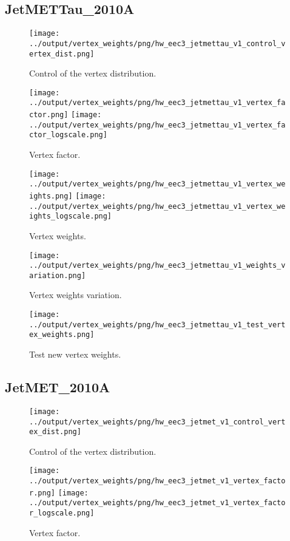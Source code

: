 \documentclass[11pt]{book}
\begin{document}
\subsection{JetMETTau\_2010A}
\begin{figure}[ht]
\centering
\texttt{[image: ../output/vertex\_weights/png/hw\_eec3\_jetmettau\_v1\_control\_vertex\_dist.png]}
\caption{Control of the vertex distribution.}
\end{figure}

\begin{figure}[ht]
\centering
\texttt{[image: ../output/vertex\_weights/png/hw\_eec3\_jetmettau\_v1\_vertex\_factor.png]}
\texttt{[image: ../output/vertex\_weights/png/hw\_eec3\_jetmettau\_v1\_vertex\_factor\_logscale.png]}
\caption{Vertex factor.}
\end{figure}

\begin{figure}[ht]
\centering
\texttt{[image: ../output/vertex\_weights/png/hw\_eec3\_jetmettau\_v1\_vertex\_weights.png]}
\texttt{[image: ../output/vertex\_weights/png/hw\_eec3\_jetmettau\_v1\_vertex\_weights\_logscale.png]}
\caption{Vertex weights.}
\end{figure}

\begin{figure}[ht]
\centering
\texttt{[image: ../output/vertex\_weights/png/hw\_eec3\_jetmettau\_v1\_weights\_variation.png]}
\caption{Vertex weights variation.}
\end{figure}

\begin{figure}[ht]
\centering
\texttt{[image: ../output/vertex\_weights/png/hw\_eec3\_jetmettau\_v1\_test\_vertex\_weights.png]}
\caption{Test new vertex weights.}
\end{figure}
\clearpage

\subsection{JetMET\_2010A}
\begin{figure}[ht]
\centering
\texttt{[image: ../output/vertex\_weights/png/hw\_eec3\_jetmet\_v1\_control\_vertex\_dist.png]}
\caption{Control of the vertex distribution.}
\end{figure}

\begin{figure}[ht]
\centering
\texttt{[image: ../output/vertex\_weights/png/hw\_eec3\_jetmet\_v1\_vertex\_factor.png]}
\texttt{[image: ../output/vertex\_weights/png/hw\_eec3\_jetmet\_v1\_vertex\_factor\_logscale.png]}
\caption{Vertex factor.}
\end{figure}
\end{document}
